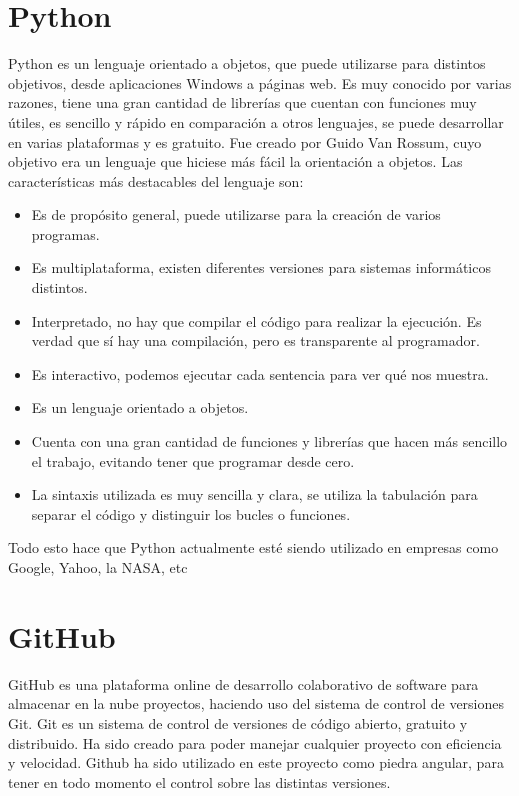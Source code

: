\section{Python}
Python \cite{python} es un lenguaje orientado a objetos, que puede utilizarse para distintos objetivos, desde aplicaciones Windows a páginas web. Es muy conocido por varias razones, tiene una gran cantidad de librerías que cuentan con funciones muy útiles, es sencillo y rápido en comparación a otros lenguajes, se puede desarrollar en varias plataformas y es gratuito.
Fue creado por Guido Van Rossum, cuyo objetivo era un lenguaje que hiciese más fácil la orientación a objetos.
Las características más destacables del lenguaje son:
\begin{itemize}
\tightlist
\item
	Es de propósito general, puede utilizarse para la creación de varios programas.
\item
	Es multiplataforma, existen diferentes versiones para sistemas informáticos distintos.
\item
	Interpretado, no hay que compilar el código para realizar la ejecución. Es verdad que sí hay una compilación, pero es transparente al programador.
\item
	Es interactivo, podemos ejecutar cada sentencia para ver qué nos muestra.
\item
	Es un lenguaje orientado a objetos.
\item
	Cuenta con una gran cantidad de funciones y librerías que hacen más sencillo el trabajo, evitando tener que programar desde cero.
\item
	La sintaxis utilizada es muy sencilla y clara, se utiliza la tabulación para separar el código y distinguir los bucles o funciones.
	
\end{itemize}
Todo esto hace que Python actualmente esté siendo utilizado en empresas como Google, Yahoo, la NASA, etc

\section{GitHub}
GitHub \cite{GitHub} es una plataforma online de desarrollo colaborativo de software para almacenar en la nube proyectos, haciendo uso del sistema de control de versiones Git.
Git es un sistema de control de versiones de código abierto, gratuito y distribuido. Ha sido creado para poder manejar cualquier proyecto con eficiencia y velocidad. Github ha sido utilizado en este proyecto como piedra angular, para tener en todo momento el control sobre las distintas versiones.

